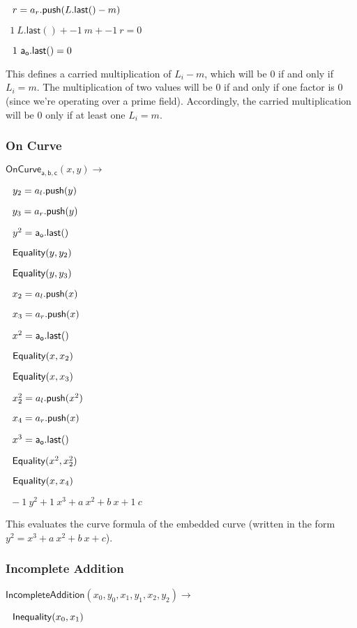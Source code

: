 \documentclass[]{article}
\begin{document}
$~~r = a_r\mathsf{.push}(L\mathsf{.last}() - m)$

$~~1 ~L\mathsf{.last}() + -1 ~m + -1 ~r = 0$

$~~1 ~\mathsf{a_o.last()} = 0$

This defines a carried multiplication of $L_i - m$, which will be $0$ if and only if $L_i = m$. The multiplication of two values will be $0$ if and only if one factor is $0$ (since we're operating over a prime field). Accordingly, the carried multiplication will be $0$ only if at least one $L_i = m$.

\subsubsection{On Curve}

\newcommand{\oncurve}{\mathsf{OnCurve_{a,b,c}}}

$\oncurve(x, y) \rightarrow$

$~~y_2 = a_l\mathsf{.push}(y)$

$~~y_3 = a_r\mathsf{.push}(y)$

$~~y^2 = \mathsf{a_o.last()}$

$~~\mathsf{Equality}(y, y_2)$

$~~\mathsf{Equality}(y, y_3)$

$~~x_2 = a_l\mathsf{.push}(x)$

$~~x_3 = a_r\mathsf{.push}(x)$

$~~x^2 = \mathsf{a_o.last()}$

$~~\mathsf{Equality}(x, x_2)$

$~~\mathsf{Equality}(x, x_3)$

$~~x^2_2 = a_l\mathsf{.push}(x^2)$

$~~x_4 = a_r\mathsf{.push}(x)$

$~~x^3 = \mathsf{a_o.last()}$

$~~\mathsf{Equality}(x^2, x^2_2)$

$~~\mathsf{Equality}(x, x_4)$

$~~-1 ~y^2 + 1 ~x^3 + a ~x^2 + b ~x + 1 ~c$

This evaluates the curve formula of the embedded curve (written in the form $y^2 = x^3 + a ~x^2 + b ~x + c$).

\newpage

\subsubsection{Incomplete Addition}

\newcommand{\incompleteadd}{\mathsf{IncompleteAddition}}

$\incompleteadd(x_0, y_0, x_1, y_1, x_2, y_2) \rightarrow$

$~~\mathsf{Inequality}(x_0, x_1)$
\end{document}
